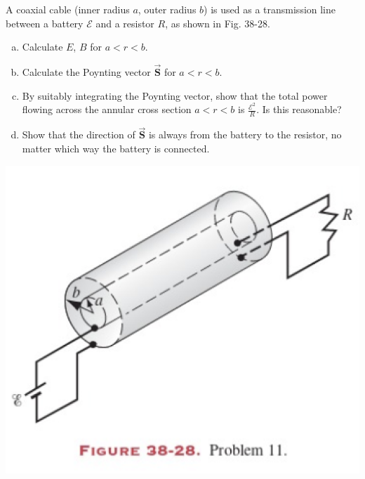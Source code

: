 \documentclass[12pt,letterpaper]{hmcpset}
\begin{document}
	\begin{problem}[38P11:]
		A coaxial cable (inner radius $a$, outer radius $b$) is used as a transmission line between a battery $\mathcal{E}$ and a resistor $R$, as shown in Fig. 38-28.
		\begin{enumerate}[(a)]
			\item Calculate $E$, $B$ for $a < r < b$.
			\item Calculate the Poynting vector $\vec{\mathbf{S}}$ for $a < r < b$.
			\item By suitably integrating the Poynting vector, show that the total power flowing across the annular cross section $a < r < b$ is $\frac{\mathcal{E}^2}{R}$. Is this reasonable?
			\item Show that the direction of $\vec{\mathbf{S}}$ is always from the battery to the resistor, no matter which way the battery is connected.
		\end{enumerate}
		
		\centering\includegraphics[scale = 0.4]{Fig_38-28}
	\end{problem}
	\clearpage
\end{document}
